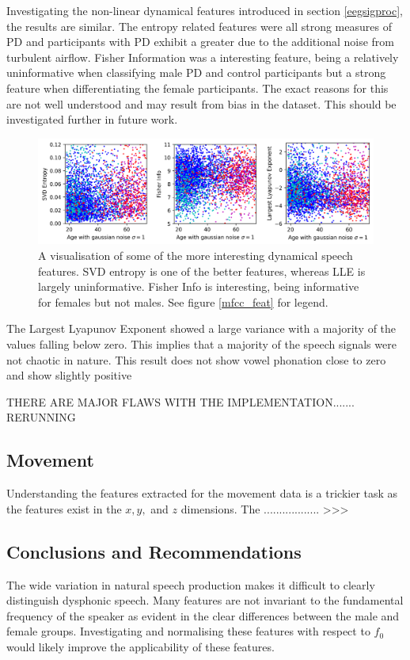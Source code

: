 \documentclass[12pt, twoside]{book}
\begin{document}
Investigating the non-linear dynamical features introduced in section \ref{eegsigproc}, the results are similar. The entropy related features were all strong measures of PD and participants with PD exhibit a greater due to the additional noise from turbulent airflow. Fisher Information was a interesting feature, being a relatively uninformative when classifying male PD and control participants but a strong feature when differentiating the female participants. The exact reasons for this are not well understood and may result from bias in the dataset. This should be investigated further in future work.


\begin{figure}[h]
	\caption{A visualisation of some of the more interesting dynamical speech features. SVD entropy is one of the better features, whereas LLE is largely uninformative. Fisher Info is interesting, being informative for females but not males. See figure \ref{mfcc_feat} for legend.}
	\label{speechdynamic}
	\centering\centerline{\includegraphics[width=1.1\linewidth]{speech_dynamic.png}}
\end{figure}

The Largest Lyapunov Exponent showed a large variance with a majority of the values falling below zero. This implies that a majority of the speech signals were not chaotic in nature. This result does not \cite{lyapunovzero, banbrook1999speechlyapunov} show vowel phonation close to zero and \cite{kokkinos2005nonlinearlyapunov,lyapunovpositive} show slightly positive

THERE ARE MAJOR FLAWS WITH THE IMPLEMENTATION....... RERUNNING

\subsection{Movement}
Understanding the features extracted for the movement data is a trickier task as the features exist in the $x, y,$ and $z$ dimensions. The .................. >>>


\subsection{Conclusions and Recommendations}
\label{visfeatrecommendations}
The wide variation in natural speech production makes it difficult to clearly distinguish dysphonic speech. Many features are not invariant to the fundamental frequency of the speaker as evident in the clear differences between the male and female groups. Investigating and normalising these features with respect to $f_0$ would likely improve the applicability of these features.
\end{document}
